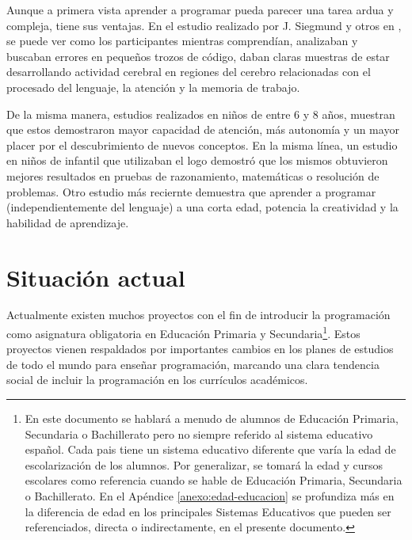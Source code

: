 Aunque a primera vista aprender a programar pueda parecer una tarea ardua y compleja, tiene sus ventajas. En el estudio realizado por J. Siegmund y otros en \cite{siegmund2014understanding}, se puede ver como los participantes mientras comprendían, analizaban y buscaban errores en pequeños trozos de código, daban claras muestras de estar desarrollando actividad cerebral en regiones del cerebro relacionadas con el procesado del lenguaje, la atención y la memoria de trabajo.

De la misma manera, estudios realizados en niños \cite{clements1986effects} de entre 6 y 8 años, muestran que estos demostraron mayor capacidad de atención, más autonomía y un mayor placer por el descubrimiento de nuevos conceptos. En la misma línea, un estudio en niños de infantil \cite{logo-geometry} que utilizaban el \Gls{logo} demostró que los mismos obtuvieron mejores resultados en pruebas de razonamiento, matemáticas o resolución de problemas. Otro estudio más reciernte \cite{liao1991effects} demuestra que aprender a programar (independientemente del lenguaje) a una corta edad, potencia la creatividad y la habilidad de aprendizaje.



\section{Situación actual}
\label{sec:situacion-actual}


Actualmente existen muchos proyectos con el fin de introducir la programación como asignatura obligatoria en Educación Primaria y Secundaria\footnote{En este documento se hablará a menudo de alumnos de Educación Primaria, Secundaria o Bachillerato pero no siempre referido al sistema educativo español. Cada pais tiene un sistema educativo diferente que varía la edad de escolarización de los alumnos. Por generalizar, se tomará la edad y cursos escolares como referencia cuando se hable de Educación Primaria, Secundaria o Bachillerato. En el Apéndice \ref{anexo:edad-educacion} se profundiza más en la diferencia de edad en los principales Sistemas Educativos que pueden ser referenciados, directa o indirectamente, en el presente documento.}. Estos proyectos vienen respaldados por importantes cambios en los planes de estudios de todo el mundo para enseñar programación\cite{cs-education,madrid-programacion,codigo21, guide-england-computing,chicago-cs}, marcando una clara tendencia social de incluir la programación en los currículos académicos.


